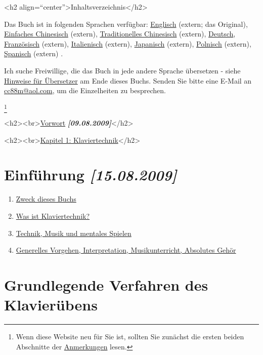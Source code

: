 
\label{Inhalt}

<h2 align=\enquote{center}>Inhaltsverzeichnis</h2>

Das Buch ist in folgenden Sprachen verfügbar:
 \hyperref[http://www.pianopractice.org]{Englisch} (extern; das Original),
 \hyperref[http://bbs.popiano.org/viewthread.php?tid=81448&amp;extra=page\%3D3]{Einfaches Chinesisch} (extern),
 \hyperref[http://www.pianogarden.tw]{Traditionelles Chinesisch} (extern),
 \hyperref[./index.html]{Deutsch},
 \hyperref[http://pagesperso-orange.fr/musico/documents/textes/pianopratique/tabledesmatieres_fr.htm]{Französisch} (extern),
 \hyperref[http://web.tiscali.it/pianobook]{Italienisch} (extern),
 \hyperref[http://pianofundamental.sakura.ne.jp]{Japanisch} (extern),
 \hyperref[http://pianoart.eu.interia.pl]{Polnisch} (extern),
 \hyperref[http://www.pianopractice.org/spanish.pdf]{Spanisch} (extern)
 .

Ich suche Freiwillige, die das Buch in jede andere Sprache übersetzen - siehe \hyperref[HinUeber]{Hinweise für Übersetzer} am Ende dieses Buchs.
Senden Sie bitte eine E-Mail an \hyperref[mailto:cc88m@aol.com?subject=foppde:\%20Translation\%20request]{cc88m@aol.com}, um die Einzelheiten zu besprechen.

\footnote{Wenn diese Website neu für Sie ist, sollten Sie zunächst die ersten beiden Abschnitte der \hyperref[anmerkungen]{Anmerkungen} lesen.}


<h2><br>\hyperref[preface]{Vorwort} \textbf{\textit{[09.08.2009]}}</h2>

<h2><br>\hyperref[c1i1]{Kapitel 1: Klaviertechnik}</h2>

\section{Einführung \textbf{\textit{[15.08.2009]}}}

\begin{enumerate} 
 \item \hyperref[c1i1]{Zweck dieses Buchs}
 \item \hyperref[c1i2]{Was ist Klaviertechnik?}
 \item \hyperref[c1i3]{Technik, Musik und mentales Spielen}
 \item \hyperref[c1i4]{Generelles Vorgehen, Interpretation, Musikunterricht, Absolutes Gehör}
\end{enumerate}

\section{Grundlegende Verfahren des Klavierübens}

